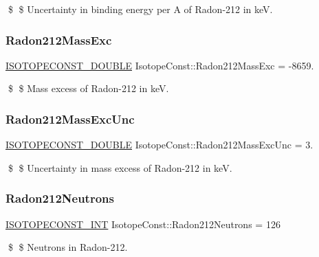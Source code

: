 \$ \$ Uncertainty in binding energy per A of Radon-\/212 in keV. \mbox{\label{group___isotope_const-_radon-_rn212_ga01bdef692291711cb91d6ea26b68a814}} 
\subsubsection{\texorpdfstring{Radon212\+Mass\+Exc}{Radon212MassExc}}
{\footnotesize\ttfamily \mbox{\hyperlink{group___isotope_const-_macros_ga8f45a7272ce02c0b4c65c44636ed719a}{I\+S\+O\+T\+O\+P\+E\+C\+O\+N\+S\+T\+\_\+\+D\+O\+U\+B\+LE}} Isotope\+Const\+::\+Radon212\+Mass\+Exc = -\/8659.}

\$ \$ Mass excess of Radon-\/212 in keV. \mbox{\label{group___isotope_const-_radon-_rn212_ga42381bb51121e35d8737e559b81a4b71}} 
\subsubsection{\texorpdfstring{Radon212\+Mass\+Exc\+Unc}{Radon212MassExcUnc}}
{\footnotesize\ttfamily \mbox{\hyperlink{group___isotope_const-_macros_ga8f45a7272ce02c0b4c65c44636ed719a}{I\+S\+O\+T\+O\+P\+E\+C\+O\+N\+S\+T\+\_\+\+D\+O\+U\+B\+LE}} Isotope\+Const\+::\+Radon212\+Mass\+Exc\+Unc = 3.}

\$ \$ Uncertainty in mass excess of Radon-\/212 in keV. \mbox{\label{group___isotope_const-_radon-_rn212_ga564905b9a907c1fc236e45ffe255403a}} 
\subsubsection{\texorpdfstring{Radon212\+Neutrons}{Radon212Neutrons}}
{\footnotesize\ttfamily \mbox{\hyperlink{group___isotope_const-_macros_ga5f18360b3e99483a35c32d789e62621c}{I\+S\+O\+T\+O\+P\+E\+C\+O\+N\+S\+T\+\_\+\+I\+NT}} Isotope\+Const\+::\+Radon212\+Neutrons = 126}

\$ \$ Neutrons in Radon-\/212. \mbox{\label{group___isotope_const-_radon-_rn212_ga8a5ffb623f5ee01fe338a7ad133cea25}} 
